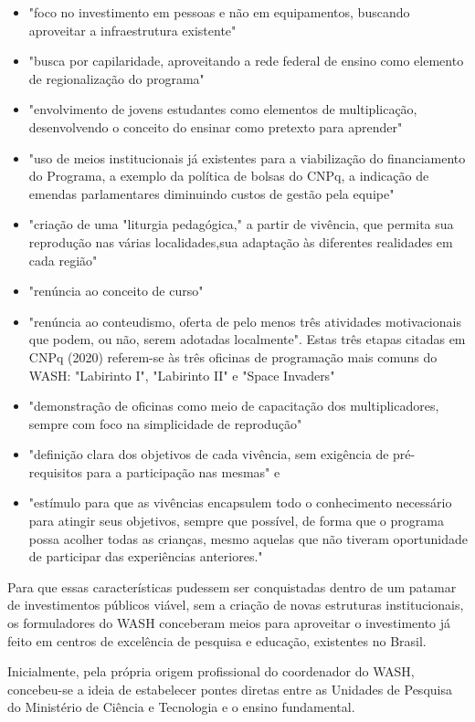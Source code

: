 \begin{itemize}
\item "foco no investimento em pessoas e não em equipamentos, buscando aproveitar a infraestrutura existente"
\item "busca por capilaridade, aproveitando a rede federal de ensino como elemento de regionalização do programa"
\item "envolvimento de jovens estudantes como elementos de multiplicação, desenvolvendo o conceito do ensinar como pretexto para aprender"
\item "uso de meios institucionais já existentes para a viabilização do financiamento do Programa, a exemplo da política de bolsas do CNPq, a indicação de emendas parlamentares diminuindo custos de gestão pela equipe"
\item "criação de uma  "liturgia pedagógica," a partir de vivência, que permita sua reprodução nas várias localidades,sua adaptação às diferentes realidades em cada região"
\item "renúncia ao conceito de curso"
\item "renúncia ao conteudismo, oferta de pelo menos três atividades motivacionais que podem, ou não, serem adotadas localmente". Estas três etapas citadas em  CNPq (2020) referem-se às três oficinas de programação mais comuns do WASH: "Labirinto I", "Labirinto II" e "Space Invaders"
\item "demonstração de oficinas como meio de capacitação dos multiplicadores, sempre com foco na simplicidade de reprodução"
\item "definição clara dos objetivos de cada vivência, sem exigência de pré-requisitos para a participação nas mesmas" e
\item "estímulo para que as vivências encapsulem todo o conhecimento necessário para  atingir  seus objetivos, sempre que possível, de forma que o programa possa acolher todas as crianças, mesmo aquelas que não tiveram oportunidade de participar das experiências anteriores."
\end{itemize}

Para que essas características pudessem ser conquistadas dentro de um patamar de investimentos públicos viável, sem a criação de novas estruturas institucionais, os formuladores do WASH conceberam meios para aproveitar o investimento já feito em centros de excelência de pesquisa e educação, existentes no Brasil.

Inicialmente, pela própria origem profissional do coordenador do WASH, concebeu-se a ideia de estabelecer pontes diretas entre as Unidades de Pesquisa do Ministério de Ciência e Tecnologia e o ensino fundamental.

